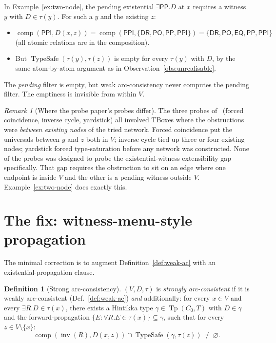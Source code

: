 \documentclass[11pt]{article}
\theoremstyle{definition}
\newtheorem{definition}[theorem]{Definition}
\theoremstyle{remark}
\newtheorem{remark}[theorem]{Remark}
\newcommand{\DR}{\mathsf{DR}}
\newcommand{\PO}{\mathsf{PO}}
\newcommand{\PP}{\mathsf{PP}}
\newcommand{\PPI}{\mathsf{PPI}}
\newcommand{\EQ}{\mathsf{EQ}}
\newcommand{\RCC}{\{\DR,\PO,\PP,\PPI\}}
\newcommand{\RCCall}{\{\DR,\PO,\EQ,\PP,\PPI\}}
\newcommand{\Tp}{\operatorname{Tp}}
\newcommand{\comp}{\operatorname{comp}}
\newcommand{\inv}{\operatorname{inv}}
\newcommand{\TypeSafe}{\operatorname{TypeSafe}}
\begin{document}
In Example~\ref{ex:two-node}, the pending existential
$\exists \PP. D$ at $x$ requires a witness $y$ with $D \in \tau(y)$.
For such a $y$ and the existing $z$:
\begin{itemize}
  \item $\comp(\PPI, D(x, z)) = \comp(\PPI, \RCC) = \RCCall$ (all
    atomic relations are in the composition).
  \item But $\TypeSafe(\tau(y), \tau(z))$ is empty for every
    $\tau(y)$ with $D$, by the same atom-by-atom argument as in
    Observation~\ref{obs:unrealisable}.
\end{itemize}
The \emph{pending} filter is empty, but weak arc-consistency never
computes the pending filter.  The emptiness is invisible from
within $V$.

\begin{remark}[Where the probe paper's probes differ]
The three probes of~\cite{PatchworkProbe} (forced coincidence,
inverse cycle, yardstick) all involved TBoxes where the obstructions
were \emph{between existing nodes} of the tried network.  Forced
coincidence put the universals between $y$ and $z$ both in $V$;
inverse cycle tied up three or four existing nodes; yardstick forced
type-saturation before any network was constructed.  None of the
probes was designed to probe the existential-witness extensibility
gap specifically.  That gap requires the obstruction to sit on an
edge where one endpoint is inside $V$ and the other is a pending
witness outside $V$.  Example~\ref{ex:two-node} does exactly this.
\end{remark}

\section{The fix: witness-menu-style propagation}
\label{sec:fix}

The minimal correction is to augment Definition~\ref{def:weak-ac}
with an existential-propagation clause.

\begin{definition}[Strong arc-consistency]
\label{def:strong-ac}
$(V, D, \tau)$ is \emph{strongly arc-consistent} if it is weakly
arc-consistent (Def.~\ref{def:weak-ac}) \emph{and} additionally: for
every $x \in V$ and every $\exists R. D \in \tau(x)$, there exists a
Hintikka type $\gamma \in \Tp(C_0, T)$ with $D \in \gamma$ and the
forward-propagation $\{E : \forall R. E \in \tau(x)\} \subseteq
\gamma$, such that for every $z \in V \setminus \{x\}$:
\[
  \comp(\inv(R), D(x, z)) \cap \TypeSafe(\gamma, \tau(z))
  \,\neq\, \varnothing.
\]
\end{definition}
\end{document}
